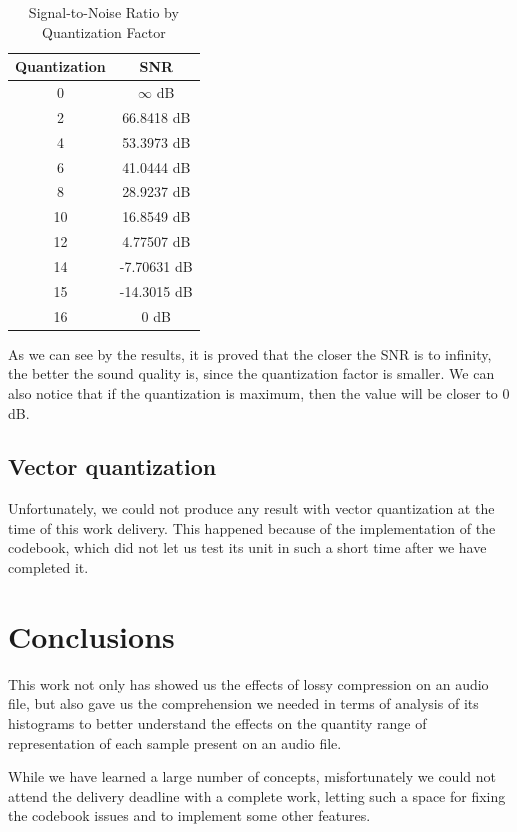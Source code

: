 \documentclass[conference]{IEEEtran}
\begin{document}
\begin{table}[!t]
\renewcommand{\arraystretch}{1.3}
\caption{Signal-to-Noise Ratio by Quantization Factor}
\label{tab:table}
\centering
\begin{tabular}{c||c}
\hline
\textbf{Quantization} & \textbf{SNR} \\ 
\hline\hline
0 & $\infty$ dB \\
2 & 66.8418 dB \\
4 & 53.3973 dB \\
6 & 41.0444 dB \\
8 & 28.9237 dB \\
10 & 16.8549 dB \\
12 & 4.77507 dB \\
14 & -7.70631 dB \\
15 & -14.3015 dB \\
16 & 0 dB \\ 
\hline
\end{tabular}
\end{table}

As we can see by the results, it is proved that the closer the SNR is to infinity, the better the sound quality is, since the quantization factor is smaller. We can also notice that if the quantization is maximum, then the value will be closer to 0 dB.

\subsection{Vector quantization}

Unfortunately, we could not produce any result with vector quantization at the time of this work delivery. This happened because of the implementation of the codebook, which did not let us test its unit in such a short time after we have completed it.

\section{Conclusions}

This work not only has showed us the effects of lossy compression on an audio file, but also gave us the comprehension we needed in terms of analysis of its histograms to better understand the effects on the quantity range of representation of each sample present on an audio file.

While we have learned a large number of concepts, misfortunately we could not attend the delivery deadline with a complete work, letting such a space for fixing the codebook issues and to implement some other features.
\end{document}
